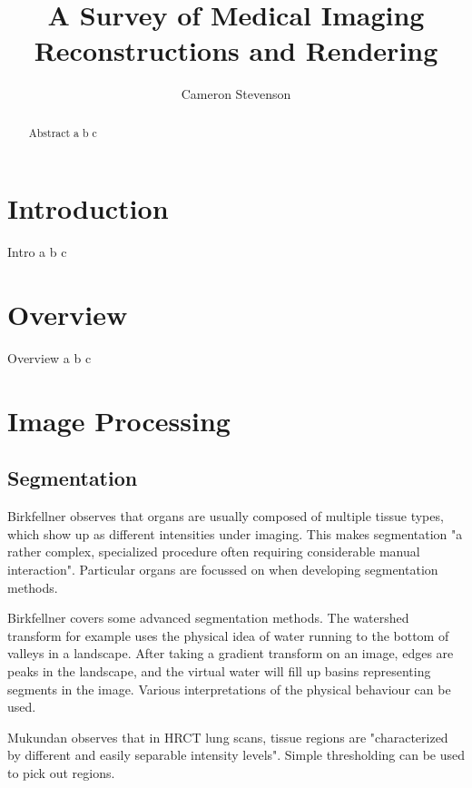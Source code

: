 \documentclass[acmsmall]{acmart}
\begin{document}
\title{A Survey of Medical Imaging Reconstructions and Rendering}
\author{Cameron Stevenson}
 
\begin{abstract}
Abstract a b c
\end{abstract}

\maketitle

\section{Introduction}

Intro a b c

\section{Overview}

Overview a b c

\section{Image Processing}

\subsection{Segmentation}

Birkfellner \cite{birkfellner2016applied} observes that organs are usually composed of multiple tissue types, which show up as different intensities under imaging. This makes segmentation "a rather complex, specialized procedure often requiring considerable manual interaction". Particular organs are focussed on when developing segmentation methods.

Birkfellner \cite{birkfellner2016applied} covers some advanced segmentation methods. The watershed transform for example uses the physical idea of water running to the bottom of valleys in a landscape. After taking a gradient transform on an image, edges are peaks in the landscape, and the virtual water will fill up basins representing segments in the image. Various interpretations of the physical behaviour can be used.

Mukundan \cite{mukundan2016reconstruction} observes that in HRCT lung scans, tissue regions are "characterized by different and easily separable intensity levels". Simple thresholding can be used to pick out regions. 
\end{document}
